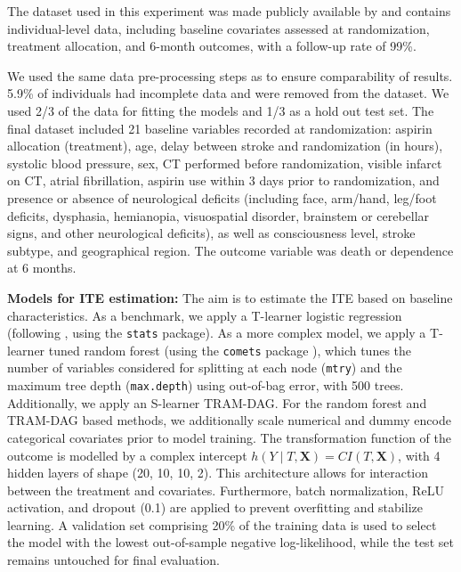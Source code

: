 The dataset used in this experiment was made publicly available by \citet{sandercock2011} and contains individual-level data, including baseline covariates assessed at randomization, treatment allocation, and 6-month outcomes, with a follow-up rate of 99\%.

We used the same data pre-processing steps as \citet{chen2025} to ensure comparability of results. 5.9\% of individuals had incomplete data and were removed from the dataset. We used 2/3 of the data for fitting the models and 1/3 as a hold out test set. The final dataset included 21 baseline variables recorded at randomization: aspirin allocation (treatment), age, delay between stroke and randomization (in hours), systolic blood pressure, sex, CT performed before randomization, visible infarct on CT, atrial fibrillation, aspirin use within 3 days prior to randomization, and presence or absence of neurological deficits (including face, arm/hand, leg/foot deficits, dysphasia, hemianopia, visuospatial disorder, brainstem or cerebellar signs, and other neurological deficits), as well as consciousness level, stroke subtype, and geographical region. The outcome variable was death or dependence at 6 months.


\medskip

\textbf{Models for ITE estimation: } The aim is to estimate the ITE based on baseline characteristics. As a benchmark, we apply a T-learner logistic regression (following \citet{chen2025}, using the \texttt{stats} package). As a more complex model, we apply a T-learner tuned random forest (using the \texttt{comets} package \citep{comets}), which tunes the number of variables considered for splitting at each node (\texttt{mtry}) and the maximum tree depth (\texttt{max.depth}) using out-of-bag error, with 500 trees. Additionally, we apply an S-learner TRAM-DAG. For the random forest and TRAM-DAG based methods, we additionally scale numerical and dummy encode categorical covariates prior to model training. The transformation function of the outcome is modelled by a complex intercept $h(Y \mid T, \mathbf{X}) = CI(T, \mathbf{X})$, with 4 hidden layers of shape (20, 10, 10, 2). This architecture allows for interaction between the treatment and covariates. Furthermore, batch normalization, ReLU activation, and dropout (0.1) are applied to prevent overfitting and stabilize learning. A validation set comprising 20\% of the training data is used to select the model with the lowest out-of-sample negative log-likelihood, while the test set remains untouched for final evaluation. 

